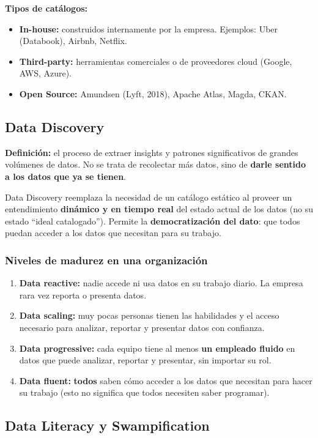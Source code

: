 \documentclass[11pt, a4paper]{article}
\begin{document}
\textbf{Tipos de catálogos:}
\begin{itemize}
	\item \textbf{In-house:} construidos internamente por la empresa. Ejemplos: Uber (Databook), Airbnb, Netflix.
	\item \textbf{Third-party:} herramientas comerciales o de proveedores cloud (Google, AWS, Azure).
	\item \textbf{Open Source:} Amundsen (Lyft, 2018), Apache Atlas, Magda, CKAN.
\end{itemize}

\subsection{Data Discovery}

\textbf{Definición:} el proceso de extraer insights y patrones significativos de grandes volúmenes de datos. No se trata de recolectar más datos, sino de \textbf{darle sentido a los datos que ya se tienen}.

Data Discovery reemplaza la necesidad de un catálogo estático al proveer un entendimiento \textbf{dinámico y en tiempo real} del estado actual de los datos (no su estado ``ideal catalogado''). Permite la \textbf{democratización del dato}: que todos puedan acceder a los datos que necesitan para su trabajo.

\subsubsection{Niveles de madurez en una organización}
\begin{enumerate}
	\item \textbf{Data reactive:} nadie accede ni usa datos en su trabajo diario. La empresa rara vez reporta o presenta datos.
	\item \textbf{Data scaling:} muy pocas personas tienen las habilidades y el acceso necesario para analizar, reportar y presentar datos con confianza.
	\item \textbf{Data progressive:} cada equipo tiene al menos \textbf{un empleado fluido} en datos que puede analizar, reportar y presentar, sin importar su rol.
	\item \textbf{Data fluent:} \textbf{todos} saben cómo acceder a los datos que necesitan para hacer su trabajo (esto no significa que todos necesiten saber programar).
\end{enumerate}

\subsection{Data Literacy y Swampification}
\end{document}
